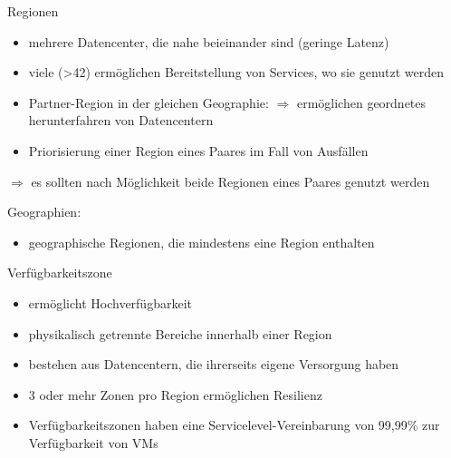 
\begin{flashcard}[Definition]{Regionen}
    \begin{itemize}
        \item mehrere Datencenter, die nahe beieinander sind (geringe Latenz)
        \item viele (>42) ermöglichen Bereitstellung von Services, wo sie genutzt werden
        \item Partner-Region in der gleichen Geographie:\newline
        $\Rightarrow$ ermöglichen geordnetes herunterfahren von Datencentern
        \item Priorisierung einer Region eines Paares im Fall von Ausfällen
    \end{itemize}
    $\Rightarrow$ es sollten nach Möglichkeit beide Regionen eines Paares genutzt werden

    \vspace{5mm}
    Geographien:
    \begin{itemize}
        \item geographische Regionen, die mindestens eine Region enthalten
    \end{itemize}

\end{flashcard}

\begin{flashcard}[Definition]{Verfügbarkeitszone}
    \begin{itemize}
        \item ermöglicht Hochverfügbarkeit
        \item physikalisch getrennte Bereiche innerhalb einer Region
        \item bestehen aus Datencentern, die ihrerseits eigene Versorgung haben
        \item 3 oder mehr Zonen pro Region ermöglichen Resilienz
        \item Verfügbarkeitszonen haben eine Servicelevel-Vereinbarung von 99,99\% zur Verfügbarkeit von VMs
    \end{itemize}
\end{flashcard}

